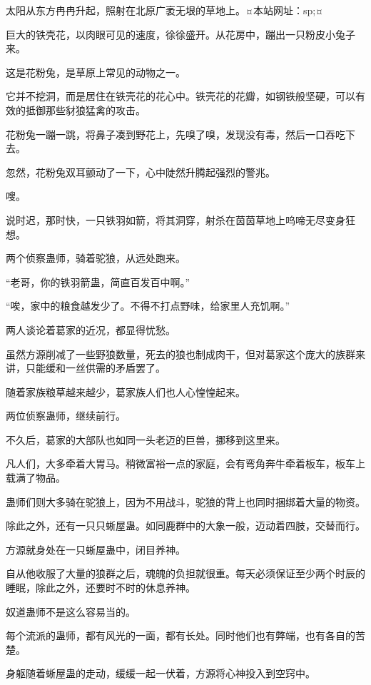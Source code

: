 
\begin{this_body}

太阳从东方冉冉升起，照射在北原广袤无垠的草地上。¤本站网址：sp;¤

巨大的铁壳花，以肉眼可见的速度，徐徐盛开。从花房中，蹦出一只粉皮小兔子来。

这是花粉兔，是草原上常见的动物之一。

它并不挖洞，而是居住在铁壳花的花心中。铁壳花的花瓣，如钢铁般坚硬，可以有效的抵御那些豺狼猛禽的攻击。

花粉兔一蹦一跳，将鼻子凑到野花上，先嗅了嗅，发现没有毒，然后一口吞吃下去。

忽然，花粉兔双耳颤动了一下，心中陡然升腾起强烈的警兆。

嗖。

说时迟，那时快，一只铁羽如箭，将其洞穿，射杀在茵茵草地上呜啼无尽变身狂想。

两个侦察蛊师，骑着驼狼，从远处跑来。

“老哥，你的铁羽箭蛊，简直百发百中啊。”

“唉，家中的粮食越发少了。不得不打点野味，给家里人充饥啊。”

两人谈论着葛家的近况，都显得忧愁。

虽然方源削减了一些野狼数量，死去的狼也制成肉干，但对葛家这个庞大的族群来讲，只能缓和一丝供需的矛盾罢了。

随着家族粮草越来越少，葛家族人们也人心惶惶起来。

两位侦察蛊师，继续前行。

不久后，葛家的大部队也如同一头老迈的巨兽，挪移到这里来。

凡人们，大多牵着大胃马。稍微富裕一点的家庭，会有弯角奔牛牵着板车，板车上载满了物品。

蛊师们则大多骑在驼狼上，因为不用战斗，驼狼的背上也同时捆绑着大量的物资。

除此之外，还有一只只蜥屋蛊。如同鹿群中的大象一般，迈动着四肢，交替而行。

方源就身处在一只蜥屋蛊中，闭目养神。

自从他收服了大量的狼群之后，魂魄的负担就很重。每天必须保证至少两个时辰的睡眠，除此之外，还要时不时的休息养神。

奴道蛊师不是这么容易当的。

每个流派的蛊师，都有风光的一面，都有长处。同时他们也有弊端，也有各自的苦楚。

身躯随着蜥屋蛊的走动，缓缓一起一伏着，方源将心神投入到空窍中。


\end{this_body}
